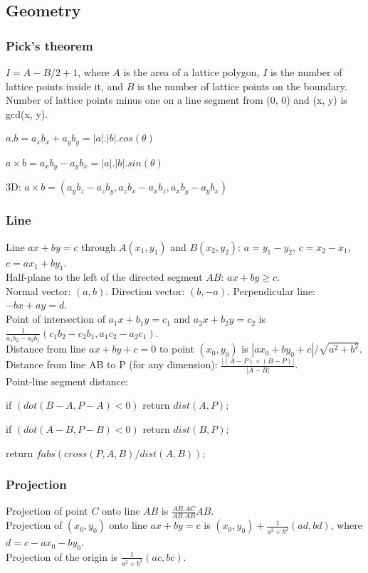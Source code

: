 \documentclass[a4paper,12pt]{article}
\begin{document}
\subsection{Geometry}
\subsubsection{Pick's theorem}
$I = A - B/2 + 1$, where $A$ is the area of a lattice polygon, $I$ is the number of lattice points inside it, and $B$ is the number of lattice points on the boundary. Number of lattice points minus one on a line segment from (0, 0) and (x, y) is gcd(x, y).

\bigskip

$a . b = a_{x}b_{x} + a_{y}b_{y} = |a| . |b| . cos(\theta)$

$a \times b = a_{x}b_{y} - a_{y}b_{x} = |a| . |b| . sin(\theta)$

3D: $a \times b = (a_{y}b_{z} - a_{z}b_{y}, a_{z}b_{x} - a_{x}b_{z}, a_{x}b_{y} - a_{y}b_{x})$

\subsubsection{Line}
Line $ax + by = c$ through $A(x_{1}, y_{1})$ and $B(x_{2}, y_{2})$: $a = y_{1} - y_{2}$, $c = x_{2} - x_{1}$, $c = ax_{1} + by_{1}$.\\
Half-plane to the left of the directed segment $AB$: $ax + by \geq c$.\\
Normal vector: $(a, b)$. Direction vector: $(b, -a)$. Perpendicular line: $-bx + ay = d$.\\
Point of intersection of $a_{1}x + b_{1}y = c_{1}$ and $a_{2}x + b_{2}y = c_{2}$ is $\frac{1}{a_{1}b_{2} - a_{2}b_{1}}(c_{1}b_{2} - c_{2}b_{1}, a_{1}c_{2} - a_{2}c_{1})$.\\
Distance from line $ax + by + c = 0$ to point $(x_{0}, y_{0})$ is $|ax_{0} + by_{0} + c|/\sqrt{a^2 + b^2}$.\\
Distance from line AB to P (for any dimension): $\frac{|(A - P) \times (B - P)|}{|A - B|}$.\\
Point-line segment distance:

if $(dot(B - A, P - A) < 0)$ return $dist(A, P);$

if $(dot(A - B, P - B) < 0)$ return $dist(B, P);$

return $fabs(cross(P, A, B)/dist(A, B));$

\subsubsection{Projection}
Projection of point $C$ onto line $AB$ is $\frac{AB.AC}{AB.AB}AB$.\\
Projection of $(x_{0}, y_{0})$ onto line $ax + by = c$ is $(x_{0}, y_{0}) + \frac{1}{a^2 + b^2}(ad, bd)$, where $d = c - ax_{0} - by_{0}$.\\
Projection of the origin is $\frac{1}{a^2 + b^2}(ac, bc)$.
\end{document}
